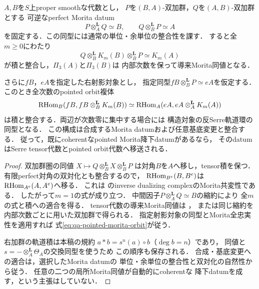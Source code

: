 \begin{proposition}
\label{prop:qa-pointed-morita-serre-transport}
$A,B$を$S$上proper smoothな代数とし，
$P$を$(B,A)$-双加群，$Q$を$(A,B)$-双加群とする
可逆なperfect Morita datum
\[
P\otimes_A^{\mathbf L}Q\simeq B,
\qquad Q\otimes_B^{\mathbf L}P\simeq A
\]
を固定する．この同型には通常の単位・余単位の整合性を課す．
すると全$m\ge0$にわたり
\begin{equation}
Q\otimes_B^{\mathbf L}K_m(B)\otimes_B^{\mathbf L}P
\simeq K_m(A)
\label{eq:qa-pointed-morita-theta}
\end{equation}
が積と整合し，$\Pi_3(A)$と$\Pi_3(B)$は
内部次数を保って導来Morita同値となる．

さらに$fB$，$eA$を指定した右射影対象とし，
指定同型$fB\otimes_B^{\mathbf L}P\simeq eA$を仮定する．
このとき全次数のpointed orbit複体
\begin{equation}
\operatorname{RHom}_B(fB,fB\otimes_B^{\mathbf L}K_m(B))
\simeq
\operatorname{RHom}_A(eA,eA\otimes_A^{\mathbf L}K_m(A))
\label{eq:qa-pointed-morita-orbit}
\end{equation}
は積と整合する．両辺が次数零に集中する場合には
構造対象の反Serre軌道環の同型となる．
この構成は合成するMorita datumおよび任意基底変更と整合する．
従って，既にcoherentなpointed Morita降下datumがあるなら，
そのdatumはSerre tensor代数とpointed orbit代数へ移送される．
\end{proposition}
\begin{proof}
双加群圏の同値
$X\mapsto Q\otimes_B^{\mathbf L}X\otimes_B^{\mathbf L}P$
は対角$B$を$A$へ移し，tensor積を保つ．
有限perfect対角の双対化とも整合するので，
$\operatorname{RHom}_{B^e}(B,B^e)$は
$\operatorname{RHom}_{A^e}(A,A^e)$へ移る．
これは\cite[Proposition~3.10(e)]{KellerDeformedCY2011}
のinverse dualizing complexのMorita共変性である．
したがって$m=1$の式が成り立つ．
中間因子$P\otimes_A^{\mathbf L}Q\simeq B$の縮約により
全$m$の式と積への適合を得る．
tensor代数の導来Morita同値は
\cite[Proposition~4.2]{KellerDeformedCY2011}，
または同じ縮約を内部次数ごとに用いた双加群で得られる．
指定射影対象の同型とMorita全忠実性を適用すれば
式\eqref{eq:qa-pointed-morita-orbit}が従う．

右加群の軌道積は本稿の規約
$a*b=s^n(a)\circ b$（$\deg b=n$）であり，
同値と$s=-\otimes_A^{\mathbf L}\Theta_A$の交換同型を使うため
この順序も保存される．
合成・基底変更への適合は，選択したMorita datumの
単位・余単位の整合性と双対化の自然性から従う．
任意の二つの局所Morita同値が自動的にcoherentな
降下datumを成す，という主張はしていない．
\end{proof}

